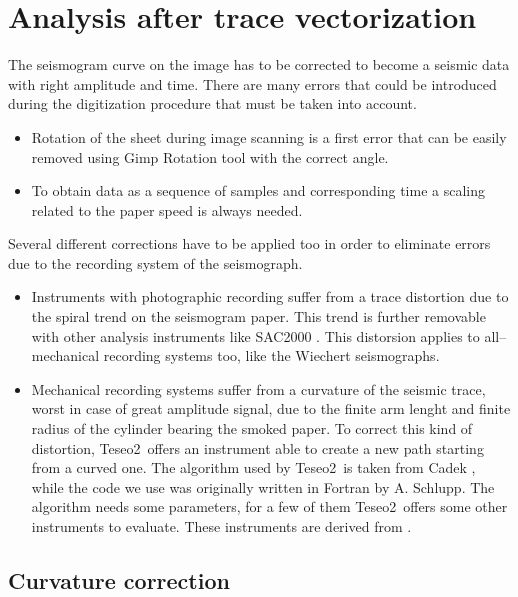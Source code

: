 \documentclass[a4paper,11pt]{article}
\newcommand{\teseo}[0]{{Teseo\small 2}}
\begin{document}
\section{Analysis after trace vectorization}

The seismogram curve on the image has to be corrected to become a seismic data with right amplitude and time.
There are many errors that could be introduced during the digitization procedure that must be taken into account.

\begin{itemize}
\item Rotation of the sheet during image scanning is a first error that can be easily removed using Gimp Rotation tool with the correct angle. 
\item To obtain data as a sequence of samples and corresponding time a scaling related to the paper speed is always needed.
\end{itemize}

Several different corrections have to be applied too in order to eliminate errors due to the recording system of the seismograph. 

\begin{itemize}
\item Instruments with photographic recording suffer from a trace distortion due to the spiral trend on the seismogram paper. This trend is further removable with other analysis instruments like SAC2000 \cite{goldstein}. This distorsion applies to all--mechanical recording systems too, like the Wiechert seismographs.
\item Mechanical recording systems suffer from a curvature of the seismic trace, worst in case of great amplitude signal, due to the finite arm lenght and finite radius of the cylinder bearing the smoked paper. To correct this kind of distortion, \teseo\ offers an instrument able to create a new path starting from a curved one. The algorithm used by \teseo\ is taken from Cadek \cite{cadek} , while the code we use was originally written in Fortran by A. Schlupp. The algorithm needs some parameters, for a few of them \teseo\ offers some other instruments to evaluate. 
These instruments are derived from \cite{schlupp}.
\end{itemize}



\subsection{Curvature correction}
\end{document}
